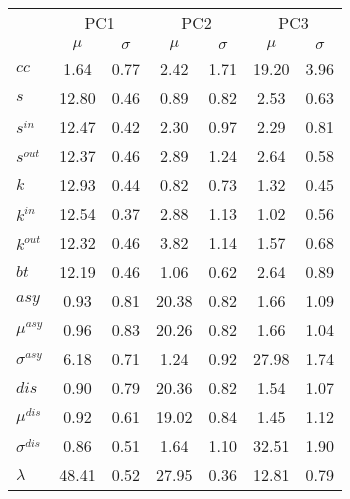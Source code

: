 \begin{center}
\begin{tabular}{| l | c | c | c | c | c | c |}\cline{2-7}
\multicolumn{1}{c|}{} & \multicolumn{2}{c|}{PC1}          & \multicolumn{2}{c|}{PC2} & \multicolumn{2}{c|}{PC3}  \\\cline{2-7}\multicolumn{1}{c|}{} & $\mu$            & $\sigma$ & $\mu$         & $\sigma$ & $\mu$ & $\sigma$  \\\hline
$cc$ & 1.64  & 0.77  & 2.42  & 1.71  & 19.20  & 3.96 \\\hline
$s$ & 12.80  & 0.46  & 0.89  & 0.82  & 2.53  & 0.63 \\
$s^{in}$ & 12.47  & 0.42  & 2.30  & 0.97  & 2.29  & 0.81 \\
$s^{out}$ & 12.37  & 0.46  & 2.89  & 1.24  & 2.64  & 0.58 \\
$k$ & 12.93  & 0.44  & 0.82  & 0.73  & 1.32  & 0.45 \\
$k^{in}$ & 12.54  & 0.37  & 2.88  & 1.13  & 1.02  & 0.56 \\
$k^{out}$ & 12.32  & 0.46  & 3.82  & 1.14  & 1.57  & 0.68 \\
$bt$ & 12.19  & 0.46  & 1.06  & 0.62  & 2.64  & 0.89 \\\hline
$asy$ & 0.93  & 0.81  & 20.38  & 0.82  & 1.66  & 1.09 \\
$\mu^{asy}$ & 0.96  & 0.83  & 20.26  & 0.82  & 1.66  & 1.04 \\
$\sigma^{asy}$ & 6.18  & 0.71  & 1.24  & 0.92  & 27.98  & 1.74 \\
$dis$ & 0.90  & 0.79  & 20.36  & 0.82  & 1.54  & 1.07 \\
$\mu^{dis}$ & 0.92  & 0.61  & 19.02  & 0.84  & 1.45  & 1.12 \\
$\sigma^{dis}$ & 0.86  & 0.51  & 1.64  & 1.10  & 32.51  & 1.90 \\
$\lambda$ & 48.41  & 0.52  & 27.95  & 0.36  & 12.81  & 0.79 \\
\hline\end{tabular}
\end{center}